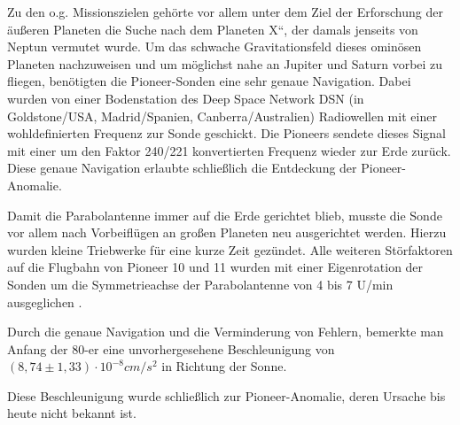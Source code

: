Zu den o.g. Missionszielen geh\"orte vor allem unter dem Ziel der
Erforschung der \"au{\ss}eren Planeten die Suche nach dem
{\quotedblbase}Planeten X``, der damals jenseits von Neptun vermutet
wurde. Um das schwache Gravitationsfeld dieses omin\"osen Planeten
nachzuweisen und um m\"oglichst nahe an Jupiter und Saturn vorbei zu
fliegen, ben\"otigten die Pioneer-Sonden eine sehr genaue Navigation.
Dabei wurden von einer Bodenstation des Deep Space Network DSN (in
Goldstone/USA, Madrid/Spanien, Canberra/Australien) Radiowellen mit
einer wohldefinierten Frequenz zur Sonde geschickt. Die Pioneers
sendete dieses Signal mit einer um den Faktor 240/221 konvertierten
Frequenz wieder zur Erde zur\"uck\cite{Dittus2006}.
Diese genaue Navigation erlaubte schlie{\ss}lich die Entdeckung der
Pioneer-Anomalie. 

Damit die Parabolantenne immer auf die Erde gerichtet blieb, musste
die Sonde vor allem nach Vorbeifl\"ugen an gro{\ss}en Planeten neu
ausgerichtet werden. Hierzu wurden kleine Triebwerke f\"ur eine kurze
Zeit gez\"undet. Alle weiteren St\"orfaktoren auf die Flugbahn von
Pioneer 10 und 11 wurden mit einer Eigenrotation der Sonden um die
Symmetrieachse der Parabolantenne von 4 bis 7 U/min
ausgeglichen\cite{Dittus2006} \cite{Nieto2007}.

Durch die genaue Navigation und die Verminderung von Fehlern,
bemerkte man Anfang der 80-er eine unvorhergesehene Beschleunigung von 
$(8,74\pm 1,33)\cdot 10^{-8}\mathit{cm}/s^{2}$ \cite{Anderson2002} in Richtung der Sonne. 

Diese Beschleunigung wurde schlie{\ss}lich zur Pioneer-Anomalie, deren
Ursache bis heute nicht bekannt ist. 